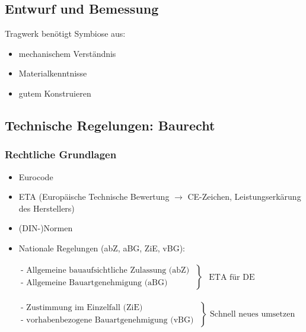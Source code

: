 \documentclass[fleqn,twoside]{article}
\begin{document}
\subsection{Entwurf und Bemessung}
    Tragwerk benötigt Symbiose aus:
    \begin{itemize}
        \item mechanischem Verständnis
        \item Materialkenntnisse
        \item gutem Konstruieren
    \end{itemize}

\subsection{Technische Regelungen: Baurecht}
    \subsubsection{Rechtliche Grundlagen}
    \begin{itemize}
        \item Eurocode
        \item ETA (Europäische Technische Bewertung $\rightarrow$ CE-Zeichen, Leistungserkärung des Herstellers)
        \item (DIN-)Normen
        \item Nationale Regelungen (abZ, aBG, ZiE, vBG):
        \end{itemize}
            \hspace*{5mm} $\begin{aligned}&\left.
            \begin{array}{l}
                \text { - Allgemeine bauaufsichtliche Zulassung (abZ) } \\
                \text { - Allgemeine Bauartgenehmigung (aBG) }
            \end{array}\right\} 
                \begin{array}{l}
                \text { ETA für DE} 
                \end{array}
            \end{aligned}$
            
            \hspace*{5mm} $\begin{aligned}&\left.
                \begin{array}{l}
                    \text { - Zustimmung im Einzelfall (ZiE) } \\
                    \text { - vorhabenbezogene Bauartgenehmigung (vBG) }    
                \end{array}\right\} \text { Schnell neues umsetzen }
            \end{aligned}$
\end{document}
